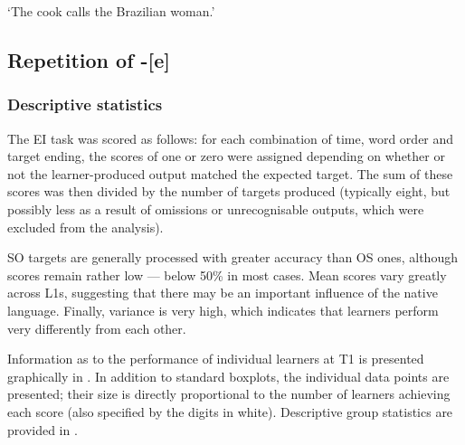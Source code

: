 \ea%
    \label{ex:04:9}
    \glt    ‘The cook calls the Brazilian woman.’
    \z
\z

\subsection{Repetition of -[e]}\label{sec:04:2.3}

\subsubsection{Descriptive statistics}\label{sec:04:2.3.1}

The EI task was scored as follows: for each combination of time, word order and target ending, the scores of one or zero were assigned depending on whether or not the learner-produced output matched the expected target. The sum of these scores was then divided by the number of targets produced (typically eight, but possibly less as a result of omissions or unrecognisable outputs, which were excluded from the analysis).

SO targets are generally processed with greater accuracy than OS ones, although scores remain rather low — below 50\% in most cases. Mean scores vary greatly across L1s, suggesting that there may be an important influence of the native language. Finally, variance is very high, which indicates that learners perform very differently from each other.

Information as to the performance of individual learners at T1 is presented graphically in . In addition to standard boxplots, the individual data points are presented; their size is directly proportional to the number of learners achieving each score (also specified by the digits in white). Descriptive group statistics are provided in .

